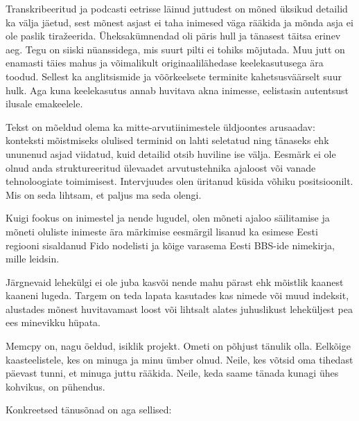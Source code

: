 Transkribeeritud ja podcasti eetrisse läinud juttudest on mõned üksikud 
detailid ka välja jäetud, sest mõnest asjast ei taha inimesed väga rääkida ja 
mõnda asja ei ole paslik tiražeerida. Üheksakümnendad oli päris hull ja 
tänasest täitsa erinev aeg. Tegu on siiski nüanssidega, mis suurt pilti ei 
tohiks mõjutada. Muu jutt on enamasti täies mahus ja võimalikult originaalilähedase keelekasutusega ära toodud. 
Sellest ka anglitsismide ja võõrkeelsete terminite kahetsusväärselt suur hulk. 
Aga kuna keelekasutus annab huvitava akna inimesse, eelistasin autentsust 
ilusale emakeelele.  

Tekst on mõeldud olema ka mitte-arvutiinimestele üldjoontes arusaadav: 
konteksti mõistmiseks olulised terminid on lahti seletatud ning tänaseks ehk 
ununenud asjad viidatud, kuid detailid otsib huviline ise välja. Eesmärk ei ole 
olnud anda struktureeritud ülevaadet arvutustehnika ajaloost või vanade 
tehnoloogiate toimimisest. Intervjuudes olen üritanud küsida võhiku 
positsioonilt. Mis on seda lihtsam, et paljus ma seda olengi.

Kuigi fookus on inimestel ja nende lugudel, olen mõneti ajaloo säilitamise ja 
mõneti oluliste inimeste ära märkimise eesmärgil lisanud ka esimese Eesti regiooni
sisaldanud Fido nodelisti ja kõige varasema Eesti BBS-ide nimekirja, mille 
leidsin.

Järgnevaid lehekülgi ei ole juba kasvõi nende mahu pärast ehk mõistlik kaanest 
kaaneni lugeda. Targem on teda lapata kasutades kas nimede või muud indeksit, 
alustades mõnest huvitavamast loost või lihtsalt alates juhuslikust leheküljest 
pea ees minevikku hüpata.

Memcpy on, nagu öeldud, isiklik projekt. Ometi on põhjust tänulik olla. 
Eelkõige kaasteelistele, kes on minuga ja minu ümber olnud. Neile, kes võtsid 
oma tihedast päevast tunni, et minuga juttu rääkida. Neile, keda saame tänada
kunagi ühes kohvikus, on pühendus.

Konkreetsed tänusõnad on aga sellised:

